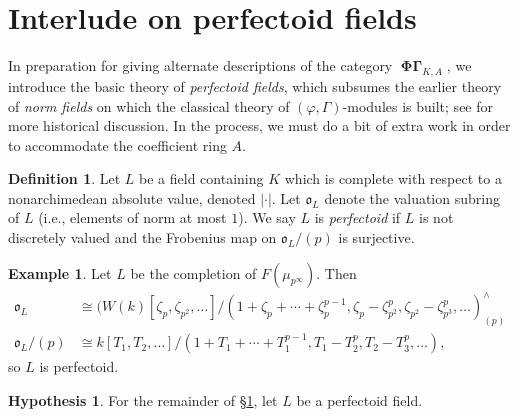 \documentclass[12pt]{amsart}
\theoremstyle{definition}
\newtheorem{defn}[theorem]{Definition}
\newtheorem{example}[theorem]{Example}
\newtheorem{hypothesis}[theorem]{Hypothesis}
\numberwithin{equation}{theorem}
\newcommand{\frako}{\mathfrak{o}}
\DeclareMathOperator{\PhiGamma}{\mathbf{\Phi \Gamma}}
\begin{document}
\section{Interlude on perfectoid fields}
\label{sec:perfectoid}

In preparation for giving alternate descriptions of the category $\PhiGamma_{K,A}$, we introduce the basic theory of \emph{perfectoid fields}, which subsumes the earlier theory of \emph{norm fields} on which the classical theory of $(\varphi, \Gamma)$-modules is built; see \cite{kedlaya-new-phigamma} for more historical discussion. In the process, we must do a bit of extra work in order to accommodate the coefficient ring $A$.

\begin{defn}
Let $L$ be a field containing $K$ which is complete with respect to a nonarchimedean absolute value, denoted $\left| \cdot \right|$. Let $\frako_L$ denote the valuation subring of $L$ (i.e., elements of norm at most $1$). We say $L$ is \emph{perfectoid} if $L$ is not discretely valued and the Frobenius map on $\frako_L/(p)$ is surjective.
\end{defn}

\begin{example}  \label{exa:cyclotomic}
Let $L$ be the completion of $F(\mu_{p^\infty})$.
Then 
\begin{align*}
\frako_L &\cong (W(k)[\zeta_p, \zeta_{p^2}, \dots]/(1 + \zeta_p + \cdots + \zeta_p^{p-1}, \zeta_p - \zeta_{p^2}^p, \zeta_{p^2} - \zeta_{p^3}^p, \dots)^{\wedge}_{(p)} \\
\frako_L/(p) &\cong k[T_1, T_2, \dots]/(1+T_1 + \cdots + T_1^{p-1}, T_1 - T_2^p, T_2 - T_3^p, \dots),
\end{align*}
so $L$ is perfectoid.
\end{example}

\begin{hypothesis}
For the remainder of \S\ref{sec:perfectoid}, let $L$ be a perfectoid field.
\end{hypothesis}
\end{document}
